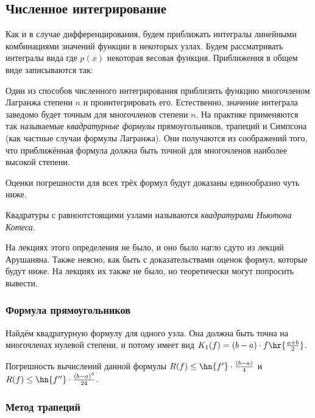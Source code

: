 \documentclass[a4paper]{article}
\begin{document}
\subsection{Численное интегрирование}

Как и в случае дифференцирования, будем приближать интегралы линейными
комбинациями значений функции в некоторых узлах.  Будем рассматривать
интегралы вида  где $p(x)$
некоторая весовая функция.  Приближения в общем виде записываются так:

Один из способов численного интегрирования приблизить функцию
многочленом Лагранжа степени $n$ и проинтегрировать его.  Естественно,
значение интеграла заведомо будет точным для многочленов степени $n$.
На практике применяются так называемые \emph{квадратурные формулы}
прямоугольников, трапеций и Симпсона (как частные случаи формулы
Лагранжа). Они получаются из соображений того, что приближённая
формула должна быть точной для многочленов наиболее высокой степени.

Оценки погрешности для всех трёх формул будут доказаны единообразно
чуть ниже.

\begin{df}
Квадратуры с равноотстоящими узлами называются \emph{квадратурами
  Ньютона Котеса}.
\end{df}

\begin{petit}
На лекциях этого определения не было, и оно было нагло сдуто из лекций
Арушаняна.  Также неясно, как быть с доказательствами оценок формул,
которые будут ниже. На лекциях их также не было, но теоретически могут
попросить вывести.
\end{petit}


\subsubsection{Формула прямоугольников}

Найдём квадратурную формулу для одного узла. Она должна быть точна на
многочленах нулевой степени, и потому имеет вид $K_1(f) = (b-a)\cdot
f\hr{\frac{a+b}{2}}$.

Погрешность вычислений данной формулы $R(f) \le \hn{f'}\cdot
\frac{(b-a)}{4}$ и $R(f) \le \hn{f''}\cdot \frac{(b-a)^3}{24}$.

\subsubsection{Метод трапеций}
\end{document}

